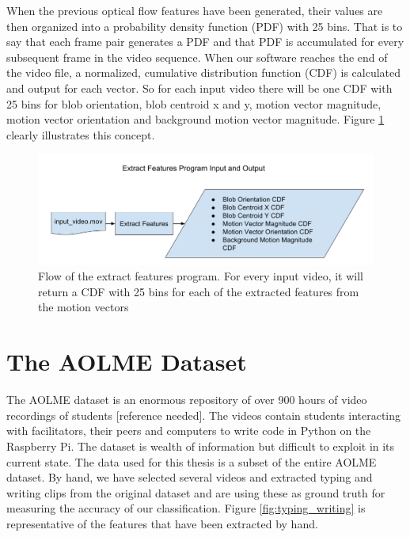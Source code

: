 When the previous optical flow features have been generated, their values are then
organized into a probability density function (PDF) with 25 bins. That is to say that
each frame pair generates a PDF and that PDF is accumulated for every subsequent
frame in the video sequence. When our software reaches the end of the video file,
a normalized, cumulative distribution function (CDF) is calculated and output
for each vector. So for each input video there will be one CDF with 25 bins
for blob orientation, blob centroid x and y, motion vector magnitude, motion
vector orientation and background motion vector magnitude. Figure \ref{fig:extract_flow}
clearly illustrates this concept.

\begin{figure}[h]
  \label{fig:extract_flow}
  \centering
  \includegraphics[width=14cm]{figures/extract_features_flow}
  \caption{Flow of the extract features program. For every input video, it will
  return a CDF with 25 bins for each of the extracted features from the motion
  vectors}
\end{figure}

\section{\label{section:the_data}The AOLME Dataset}
The AOLME dataset is an enormous repository of over 900 hours of video
recordings of students [reference needed]. The videos contain students
interacting with facilitators, their peers and computers to write code in
Python on the Raspberry Pi.  The dataset is wealth of information but difficult
to exploit in its current state.  The data used for this thesis is a subset of
the entire AOLME dataset. By hand, we have selected several videos and extracted
typing and writing clips from the original dataset and are using these as ground
truth for measuring the accuracy of our classification. Figure \ref{fig:typing_writing}
is representative of the features that have been extracted by hand.


